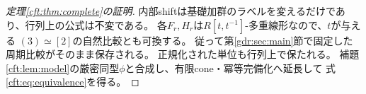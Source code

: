 \begin{proof}[定理\ref{cft:thm:complete}の証明]
内部shiftは基礎加群のラベルを変えるだけであり、行列上の公式は不変である。
各$F_r,H_r$は$R[t,t^{-1}]$-多重線形なので、$t$が与える
$(3)\simeq[2]$の自然比較とも可換する。
従って第\ref{gdr:sec:main}節で固定した周期比較がそのまま保存される。
正規化された単位も行列上で保たれる。
補題\ref{cft:lem:model}の厳密同型$\phi$と合成し、有限cone・冪等完備化へ延長して
式\eqref{cft:eq:equivalence}を得る。
\end{proof}
